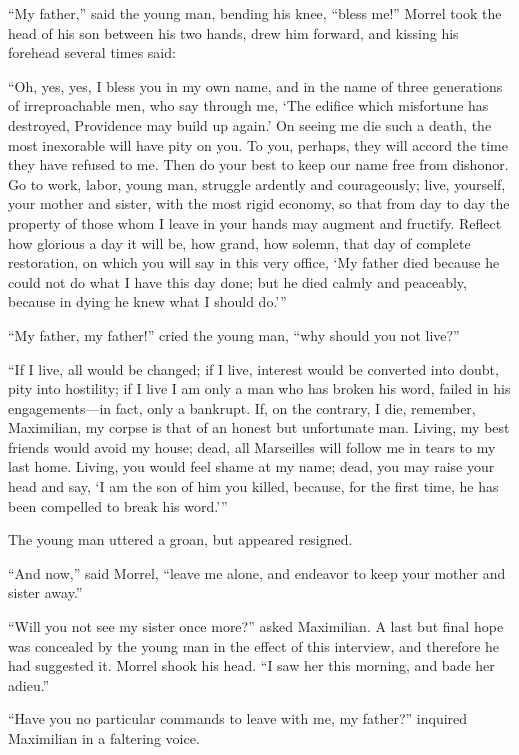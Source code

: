 “My father,” said the young man, bending his knee, “bless me!” Morrel
took the head of his son between his two hands, drew him forward, and
kissing his forehead several times said:

“Oh, yes, yes, I bless you in my own name, and in the name of three
generations of irreproachable men, who say through me, ‘The edifice
which misfortune has destroyed, Providence may build up again.’ On
seeing me die such a death, the most inexorable will have pity on you.
To you, perhaps, they will accord the time they have refused to me.
Then do your best to keep our name free from dishonor. Go to work,
labor, young man, struggle ardently and courageously; live, yourself,
your mother and sister, with the most rigid economy, so that from day
to day the property of those whom I leave in your hands may augment and
fructify. Reflect how glorious a day it will be, how grand, how solemn,
that day of complete restoration, on which you will say in this very
office, ‘My father died because he could not do what I have this day
done; but he died calmly and peaceably, because in dying he knew what I
should do.’”

“My father, my father!” cried the young man, “why should you not live?”

“If I live, all would be changed; if I live, interest would be
converted into doubt, pity into hostility; if I live I am only a man
who has broken his word, failed in his engagements—in fact, only a
bankrupt. If, on the contrary, I die, remember, Maximilian, my corpse
is that of an honest but unfortunate man. Living, my best friends would
avoid my house; dead, all Marseilles will follow me in tears to my last
home. Living, you would feel shame at my name; dead, you may raise your
head and say, ‘I am the son of him you killed, because, for the first
time, he has been compelled to break his word.’”

The young man uttered a groan, but appeared resigned.

“And now,” said Morrel, “leave me alone, and endeavor to keep your
mother and sister away.”

“Will you not see my sister once more?” asked Maximilian. A last but
final hope was concealed by the young man in the effect of this
interview, and therefore he had suggested it. Morrel shook his head. “I
saw her this morning, and bade her adieu.”

“Have you no particular commands to leave with me, my father?” inquired
Maximilian in a faltering voice.

